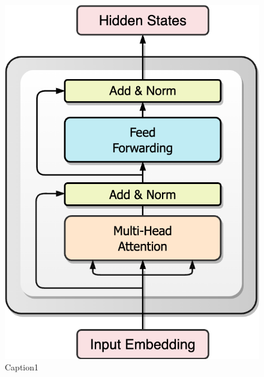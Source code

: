 \documentclass{article}
\begin{document}
\begin{figure}[ht]
  \begin{minipage}[b]{0.33\textwidth}
    \centering
    \includegraphics[width=0.73\linewidth]{pics/TransformerEncoder.drawio.png}
    \caption{Caption1}
    \label{fig:subim1}
  \end{minipage}
  \begin{minipage}[b]{0.33\textwidth}
    \centering

\end{minipage}
\end{figure}
\end{document}
